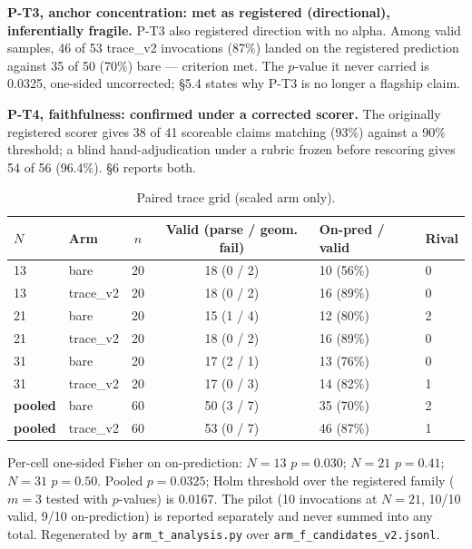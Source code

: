 \documentclass[11pt]{article}
\begin{document}
\textbf{P-T3, anchor concentration: met as registered (directional), inferentially fragile.} P-T3
also registered direction with no alpha. Among valid samples, 46 of 53 trace\_v2 invocations
(87\%) landed on the registered prediction against 35 of 50 (70\%) bare --- criterion met. The
$p$-value it never carried is 0.0325, one-sided uncorrected; \S5.4 states why P-T3 is no longer a
flagship claim.

\textbf{P-T4, faithfulness: confirmed under a corrected scorer.} The originally registered scorer
gives 38 of 41 scoreable claims matching (93\%) against a 90\% threshold; a blind hand-adjudication
under a rubric frozen before rescoring gives 54 of 56 (96.4\%). \S6 reports both.

\begin{table}[htbp]
\centering
\caption{Paired trace grid (scaled arm only).}
\label{tab:trace}
\small
\begin{tabular}{llccll}
\toprule
$N$ & Arm & $n$ & Valid (parse / geom. fail) & On-pred / valid & Rival \\
\midrule
13 & bare     & 20 & 18 (0 / 2) & 10 (56\%) & 0 \\
13 & trace\_v2 & 20 & 18 (0 / 2) & 16 (89\%) & 0 \\
21 & bare     & 20 & 15 (1 / 4) & 12 (80\%) & 2 \\
21 & trace\_v2 & 20 & 18 (0 / 2) & 16 (89\%) & 0 \\
31 & bare     & 20 & 17 (2 / 1) & 13 (76\%) & 0 \\
31 & trace\_v2 & 20 & 17 (0 / 3) & 14 (82\%) & 1 \\
\addlinespace
\textbf{pooled} & bare     & 60 & 50 (3 / 7) & 35 (70\%) & 2 \\
\textbf{pooled} & trace\_v2 & 60 & 53 (0 / 7) & 46 (87\%) & 1 \\
\bottomrule
\end{tabular}

\vspace{4pt}
\begin{minipage}{\linewidth}
\footnotesize
Per-cell one-sided Fisher on on-prediction: $N = 13$ $p = 0.030$; $N = 21$ $p = 0.41$; $N = 31$ $p = 0.50$.
Pooled $p = 0.0325$; Holm threshold over the registered family ($m = 3$ tested with $p$-values) is
0.0167. The pilot (10 invocations at $N = 21$, 10/10 valid, 9/10 on-prediction) is reported
separately and never summed into any total. Regenerated by \texttt{arm\_t\_analysis.py} over
\texttt{arm\_f\_candidates\_v2.jsonl}.
\end{minipage}
\end{table}
\end{document}
